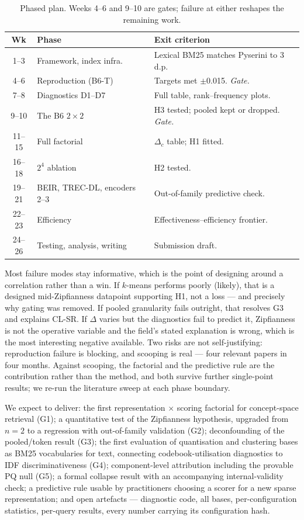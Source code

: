 \documentclass[11pt]{article}
\begin{document}
\begin{table}[h]
\centering\small
\begin{tabular}{@{}clp{3.1cm}@{}}
\toprule
Wk & Phase & Exit criterion \\
\midrule
1--3 & Framework, index infra. & Lexical BM25 matches Pyserini to 3 d.p. \\
4--6 & Reproduction (B6-T) & Targets met $\pm$0.015. \emph{Gate.} \\
7--8 & Diagnostics D1--D7 & Full table, rank--frequency plots. \\
9--10 & The B6 $2\times2$ & H3 tested; pooled kept or dropped. \emph{Gate.} \\
11--15 & Full factorial & $\Delta_c$ table; H1 fitted. \\
16--18 & $2^4$ ablation & H2 tested. \\
19--21 & BEIR, TREC-DL, encoders 2--3 & Out-of-family predictive check. \\
22--23 & Efficiency & Effectiveness--efficiency frontier. \\
24--26 & Testing, analysis, writing & Submission draft. \\
\bottomrule
\end{tabular}
\caption{Phased plan. Weeks 4--6 and 9--10 are gates; failure at either reshapes the remaining work.}
\label{tab:timeline}
\end{table}

Most failure modes stay informative, which is the point of designing around a correlation rather than a win. If $k$-means performs poorly (likely), that is a designed mid-Zipfianness datapoint supporting H1, not a loss --- and precisely why gating was removed. If pooled granularity fails outright, that resolves G3 and explains CL-SR. If $\Delta$ varies but the diagnostics fail to predict it, Zipfianness is not the operative variable and the field's stated explanation is wrong, which is the most interesting negative available. Two risks are not self-justifying: reproduction failure is blocking, and scooping is real --- four relevant papers in four months. Against scooping, the factorial and the predictive rule are the contribution rather than the method, and both survive further single-point results; we re-run the literature sweep at each phase boundary.

We expect to deliver: the first representation $\times$ scoring factorial for concept-space retrieval (G1); a quantitative test of the Zipfianness hypothesis, upgraded from $n{=}2$ to a regression with out-of-family validation (G2); deconfounding of the pooled/token result (G3); the first evaluation of quantisation and clustering bases as BM25 vocabularies for text, connecting codebook-utilisation diagnostics to IDF discriminativeness (G4); component-level attribution including the provable PQ null (G5); a formal collapse result with an accompanying internal-validity check; a predictive rule usable by practitioners choosing a scorer for a new sparse representation; and open artefacts --- diagnostic code, all bases, per-configuration statistics, per-query results, every number carrying its configuration hash.
\end{document}
